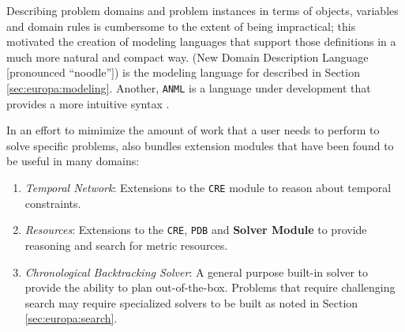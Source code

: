 Describing problem domains and problem instances in terms of objects,
variables and domain rules is cumbersome to the extent of being
impractical; this motivated the creation of modeling languages that
support those definitions in a much more natural and compact way. \nd
(New Domain Description Language [pronounced ``noodle'']) \cite{NDDL}
is the  modeling language for \eu described in
Section \ref{sec:europa:modeling}. Another, \texttt{ANML}
\cite{smith08} is a language under development that provides a more
intuitive syntax .
  
In an effort to mimimize the amount of work that a user needs to
perform to solve specific problems, \eu also bundles extension
modules that have been found to be useful in many domains:

\begin{enumerate}

\item \textit{Temporal Network}: Extensions to the \texttt{CRE} module to
  reason about temporal constraints.

\item \textit{Resources}: Extensions to the \texttt{CRE}, \texttt{PDB}
  and \textbf{Solver Module} to provide reasoning and search for
  metric resources.

\item \textit{Chronological Backtracking Solver}: A general purpose
  built-in solver to provide the ability to plan out-of-the-box.
  Problems that require challenging search may require specialized
  solvers to be built as noted in Section \ref{sec:europa:search}.

\end{enumerate}


